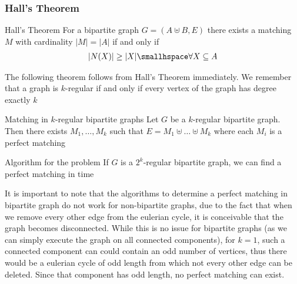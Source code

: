 \subsubsection{Hall's Theorem}
\begin{theorem}[]{Hall's Theorem}
    For a bipartite graph $G = (A \uplus B, E)$ there exists a matching $M$ with cardinality $|M| = |A|$ if and only if
    \begin{align*}
        |N(X)| \geq |X| \smallhspace \forall X \subseteq{A}
    \end{align*}
\end{theorem}
The following theorem follows from Hall's Theorem immediately. We remember that a graph is $k$-regular if and only if every vertex of the graph has degree exactly $k$

\begin{theorem}[]{Matching in $k$-regular bipartite graphs}
    Let $G$ be a $k$-regular bipartite graph. Then there exists $M_1, \ldots, M_k$ such that $E = M_1 \uplus \ldots \uplus M_k$ where each $M_i$ is a perfect matching
\end{theorem}

\begin{theorem}[]{Algorithm for the problem}
    If $G$ is a $2^k$-regular bipartite graph, we can find a perfect matching in time 
\end{theorem}
It is important to note that the algorithms to determine a perfect matching in bipartite graph do not work for non-bipartite graphs, due to the fact that when we remove every other edge from the eulerian cycle, it is conceivable that the graph becomes disconnected. While this is no issue for bipartite graphs (as we can simply execute the graph on all connected components), for $k = 1$, such a connected component can could contain an odd number of vertices, thus there would be a eulerian cycle of odd length from which not every other edge can be deleted. Since that component has odd length, no perfect matching can exist.

